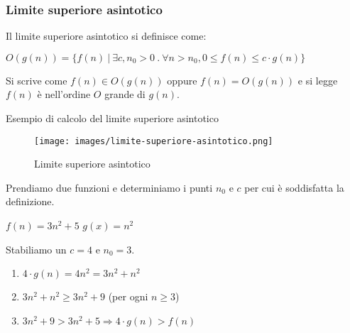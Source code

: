 \subsubsection{Limite superiore asintotico}
\begin{definition}
Il limite superiore asintotico si definisce come:
\begin{center}
    $O(g(n)) = \{f(n) \: |\: \exists c, n_0 > 0 \: . \: \forall n > n_0, 0 \leq f(n) \leq c \cdot g(n)\}$
\end{center}
\end{definition}
\hspace{-15pt}Si scrive come $f(n) \in O(g(n))$ oppure $f(n) = O(g(n))$ e si legge $f(n)$ è nell'ordine $O$ grande di $g(n)$.
\begin{example}
Esempio di calcolo del limite superiore asintotico
\end{example}
\begin{wrapfigure}[7]{l}{8cm}
    \vspace{-15pt}
    \centering
    \texttt{[image: images/limite-superiore-asintotico.png]}
    \vspace{-5pt}
    \caption{Limite superiore asintotico}
\end{wrapfigure}
Prendiamo due funzioni e determiniamo i punti $n_0$ e $c$ per cui è soddisfatta la definizione.
\begin{center}
    \vspace{-5pt}
    $f(n) = 3n^2 + 5$ \: \: \: $g(x)=n^2$
\end{center}
Stabiliamo un $c = 4$ e $n_0 = 3$.
\begin{enumerate}
    \item $4 \cdot g(n) = 4n^2 = 3n^2 + n^2 $
    \item $3n^2 + n^2 \geq 3n^2 + 9 $ (per ogni $n \geq 3$)
    \item $3n^2 + 9 > 3n^2+5 \Longrightarrow 4 \cdot g(n) > f(n)$
\end{enumerate}

